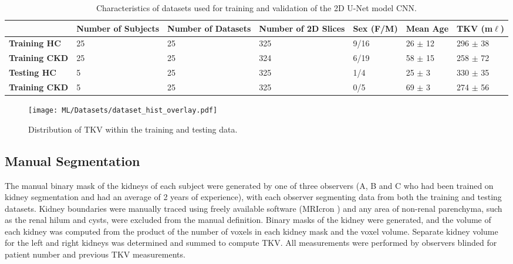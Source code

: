 \begin{table}[h]
	\centering
	\begin{tabularx}{\textwidth}{X|XXXXXX}
		\hline
		& \textbf{Number of Subjects} & \textbf{Number of Datasets} & \textbf{Number of 2D Slices} & \textbf{Sex (F/M)} & \textbf{Mean Age} & \textbf{TKV (m$\ell$)} \\ \hline
		\textbf{Training HC}  & 25                          & 25                          & 325                          & 9/16               & 26 $\pm$ 12       & 296 $\pm$ 38           \\
		\textbf{Training CKD} & 25                          & 25                          & 324                          & 6/19               & 58 $\pm$ 15       & 258 $\pm$ 72           \\
		\textbf{Testing HC}   & 5                           & 25                          & 325                          & 1/4                & 25 $\pm$ 3        & 330 $\pm$ 35           \\
		\textbf{Training CKD} & 5                           & 25                          & 325                          & 0/5                & 69 $\pm$ 3        & 274 $\pm$ 56          
	\end{tabularx}
	\caption{Characteristics of datasets used for training and validation of the 2D U-Net model \ac{CNN}.}
	\label{tab:ml_datasets}
\end{table}
\begin{figure}[h]
	\centering
	\texttt{[image: ML/Datasets/dataset\_hist\_overlay.pdf]}
	\caption{Distribution of \ac{TKV} within the training and testing data.}
	\label{fig:ml_true_tkv_hist}	
\end{figure}

\subsection{Manual Segmentation}
The manual binary mask of the kidneys of each subject were generated by one of three observers (A, B and C who had been trained on kidney segmentation and had an average of 2 years of experience), with each observer segmenting data from both the training and testing datasets. Kidney boundaries were manually traced using freely available software (MRIcron \cite{rorden_neurolabuscmricron_2021}) and any area of non-renal parenchyma, such as the renal hilum and cysts, were excluded from the manual definition. Binary masks of the kidney were generated, and the volume of each kidney was computed from the product of the number of voxels in each kidney mask and the voxel volume. Separate kidney volume for the left and right kidneys was determined and summed to compute \ac{TKV}. All measurements were performed by observers blinded for patient number and previous \ac{TKV} measurements. 

